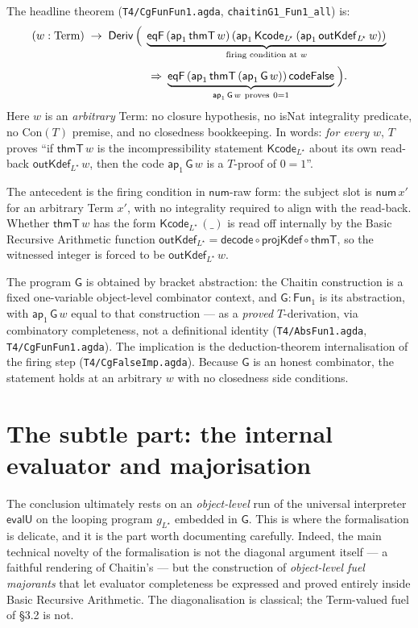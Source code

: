 \documentclass[11pt]{article}
\newcommand{\Term}{\mathrm{Term}}
\newcommand{\Deriv}{\mathsf{Deriv}}
\newcommand{\thmT}{\mathsf{thmT}}
\newcommand{\evalU}{\mathsf{evalU}}
\newcommand{\Kcode}{\mathsf{Kcode}}
\newcommand{\outK}{\mathsf{outKdef}}
\newcommand{\codeFalse}{\mathsf{codeFalse}}
\newcommand{\num}{\mathsf{num}}
\newcommand{\ap}[1]{\mathsf{ap}_{#1}}
\newcommand{\Fun}[1]{\mathsf{Fun}_{#1}}
\newcommand{\imp}{\mathbin{\Rightarrow}}
\newcommand{\eqF}{\mathsf{eqF}}
\newcommand{\GG}{\mathsf{G}}
\newcommand{\Lstar}{L^{\!\star}}
\begin{document}
The headline theorem
(\texttt{T4/CgFunFun1.agda}, \texttt{chaitinG1\_Fun1\_all}) is:
\[
  \begin{aligned}
  (w : \Term) \;\to\; \Deriv\,\Bigl(\;
    & \underbrace{\eqF\,(\ap{1}\,\thmT\,w)\,
          (\ap{1}\,\Kcode_{\Lstar}\,(\ap{1}\,\outK_{\Lstar}\,w))}_{\text{firing condition at }w} \\[2pt]
    & {}\;\imp\;
      \underbrace{\eqF\,(\ap{1}\,\thmT\,(\ap{1}\,\GG\,w))\,\codeFalse}_{\ap{1}\,\GG\,w\ \text{proves}\ 0=1}
    \;\Bigr).
  \end{aligned}
\]
Here $w$ is an \emph{arbitrary} Term: no closure hypothesis, no
\textsf{isNat} integrality predicate, no $\mathrm{Con}(T)$ premise, and
no closedness bookkeeping. In words: \emph{for every} $w$, $T$ proves
``if $\thmT\,w$ is the incompressibility statement $\Kcode_{\Lstar}$
about its own read-back $\outK_{\Lstar}\,w$, then the code
$\ap{1}\,\GG\,w$ is a $T$-proof of $0=1$''.

The antecedent is the firing condition in $\num$-raw form: the subject
slot is $\num\,x'$ for an arbitrary Term $x'$, with no integrality
required to align with the read-back. Whether $\thmT\,w$ has the form
$\Kcode_{\Lstar}\,(\_)$ is read off internally by the Basic Recursive Arithmetic function
$\outK_{\Lstar} = \mathsf{decode}\circ\mathsf{projKdef}\circ\thmT$, so
the witnessed integer is forced to be $\outK_{\Lstar}\,w$.

The program $\GG$ is obtained by bracket abstraction: the Chaitin
construction is a fixed one-variable object-level combinator context,
and $\GG : \Fun{1}$ is its abstraction, with $\ap{1}\,\GG\,w$ equal to
that construction --- as a \emph{proved} $T$-derivation, via combinatory
completeness, not a definitional identity
(\texttt{T4/AbsFun1.agda}, \texttt{T4/CgFunFun1.agda}). The
implication is the deduction-theorem internalisation of the firing step
(\texttt{T4/CgFalseImp.agda}). Because $\GG$ is an honest combinator,
the statement holds at an arbitrary $w$ with no closedness side
conditions.

\section{The subtle part: the internal evaluator and majorisation}

The conclusion ultimately rests on an \emph{object-level} run of the
universal interpreter $\evalU$ on the looping program $g_{\Lstar}$
embedded in $\GG$. This is where the formalisation is delicate, and it
is the part worth documenting carefully. Indeed, the main technical
novelty of the formalisation is not the diagonal argument itself --- a
faithful rendering of Chaitin's --- but the construction of
\emph{object-level fuel majorants} that let evaluator completeness be
expressed and proved entirely inside Basic Recursive Arithmetic. The diagonalisation is
classical; the Term-valued fuel of \S3.2 is not.
\end{document}
